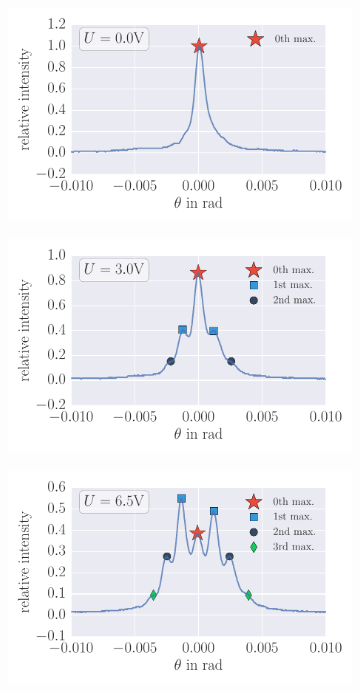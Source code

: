 \begin{figure}[H]
    \centering
    \begin{subfigure}[b]{\picwidth}
        \includegraphics[width=1.0\textwidth]{analysis/figures/raman_001}
        \caption{}
        \label{fig:raman_001}
    \end{subfigure}
    \begin{subfigure}[b]{\picwidth}
        \includegraphics[width=1.0\textwidth]{analysis/figures/raman_007}
        \caption{}
        \label{fig:raman_007}
    \end{subfigure}
    \begin{subfigure}[b]{\picwidth}
        \includegraphics[width=1.0\textwidth]{analysis/figures/raman_014}

\end{subfigure}
\end{figure}
